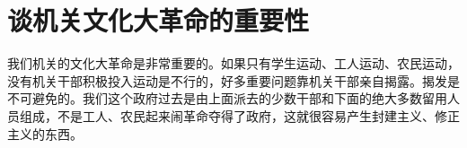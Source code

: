 \section[谈机关文化大革命的重要性（一九六七年一月九日）]{谈机关文化大革命的重要性}


我们机关的文化大革命是非常重要的。如果只有学生运动、工人运动、农民运动，没有机关干部积极投入运动是不行的，好多重要问题靠机关干部亲自揭露。揭发是不可避免的。我们这个政府过去是由上面派去的少数干部和下面的绝大多数留用人员组成，不是工人、农民起来闹革命夺得了政府，这就很容易产生封建主义、修正主义的东西。


